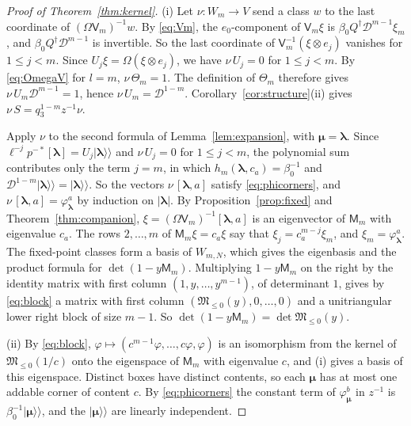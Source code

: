 \documentclass[11pt]{amsart}
\theoremstyle{definition}
\theoremstyle{remark}
\newcommand{\betaz}{\beta_0}                     %
\newcommand{\bl}{{\boldsymbol{\lambda}}}         %
\newcommand{\bmu}{{\boldsymbol{\mu}}}
\newcommand{\ceig}[1]{c_{#1}}                    %
\newcommand{\Wdeg}[2]{W_{#1,#2}}                 %
\newcommand{\Wsp}[1]{W_{#1}}                     %
\newcommand{\auxe}[1]{e_{#1}}                    %
\newcommand{\kket}[1]{\lvert #1\rangle\!\rangle} %
\newcommand{\fix}[1]{[#1]}                       %
\newcommand{\pt}[2]{[#1,#2]}                     %
\newcommand{\taut}{\ell}                         %
\newcommand{\pulm}{p^{-*}}                       %
\newcommand{\Shift}{S}                           %
\newcommand{\Omap}{\Omega}                       %
\newcommand{\DD}{\mathcal D}
\newcommand{\MM}{\mathsf M}
\newcommand{\Miura}[1]{\MM_{#1}}                 %
\newcommand{\VV}{\mathsf V}
\newcommand{\Vconj}[1]{\VV_{#1}}                 %
\newcommand{\Miuraop}{\mathfrak M}               %
\newcommand{\Miuraproj}{\Miuraop_{\leq0}}         %
\newcommand{\Meig}[2]{\varphi_{#1}^{#2}}         %
\newcommand{\Qan}{Q^\dagger}                     %
\begin{document}
\begin{proof}[Proof of Theorem~\ref{thm:kernel}]
(i) Let \(\nu\colon\Wsp{m}\to V\) send a class \(w\) to the last coordinate of
\((\Omap\Vconj{m})^{-1}w\).
By \eqref{eq:Vm}, the \(\auxe{0}\)-component of \(\Vconj{m}\xi\) is \(\betaz\Qan\DD^{m-1}\xi_m\), and
\(\betaz\Qan\DD^{m-1}\) is invertible. So the last coordinate of \(\Vconj{m}^{-1}(\xi\otimes\auxe{j})\) vanishes
for \(1\leq j<m\). Since \(U_j\xi=\Omap(\xi\otimes\auxe{j})\), we have \(\nu\,U_j=0\) for \(1\leq j<m\).
By \eqref{eq:OmegaV} for \(l=m\), \(\nu\,\Theta_m=1\). The definition of \(\Theta_m\) therefore gives
\(\nu\,U_m\DD^{m-1}=1\), hence \(\nu\,U_m=\DD^{1-m}\).
Corollary~\ref{cor:structure}(ii) gives \(\nu\,\Shift=q_3^{1-m}z^{-1}\nu\).

Apply \(\nu\) to the second formula of Lemma~\ref{lem:expansion}, with \(\bmu=\bl\).
Since \(\taut^{-j}\pulm\fix{\bl}=U_j\kket{\bl}\) and \(\nu\,U_j=0\) for \(1\leq j<m\),
the polynomial sum contributes only the term \(j=m\), in which
\(h_m(\bl,\ceig{a})=\betaz^{-1}\) and \(\DD^{1-m}\kket{\bl}=\kket{\bl}\). So the vectors \(\nu\,\pt{\bl}{a}\)
satisfy \eqref{eq:phicorners}, and \(\nu\,\pt{\bl}{a}=\Meig{\bl}{a}\) by induction on \(|\bl|\). By
Proposition~\ref{prop:fixed} and Theorem~\ref{thm:companion}, \(\xi=(\Omap\Vconj{m})^{-1}\pt{\bl}{a}\) is an
eigenvector of \(\Miura{m}\) with eigenvalue \(\ceig{a}\). The rows \(2,\dots,m\) of
\(\Miura{m}\xi=\ceig{a}\xi\) say that \(\xi_j=\ceig{a}^{m-j}\xi_m\), and \(\xi_m=\Meig{\bl}{a}\).
The fixed-point classes form a basis of \(\Wdeg{m}{N}\), which gives the eigenbasis
and the product formula for \(\det(1-y\Miura{m})\).
Multiplying \(1-y\Miura{m}\) on the right by the identity matrix with first column \((1,y,\dots,y^{m-1})\), of
determinant \(1\), gives by \eqref{eq:block} a matrix with first column \((\Miuraproj(y),0,\dots,0)\) and a
unitriangular lower right block of size \(m-1\). So \(\det(1-y\Miura{m})=\det\Miuraproj(y)\).

(ii) By \eqref{eq:block}, \(\varphi\mapsto(c^{m-1}\varphi,\dots,c\varphi,\varphi)\) is an isomorphism from the
kernel of \(\Miuraproj(1/c)\) onto the eigenspace of \(\Miura{m}\) with eigenvalue \(c\), and (i) gives a basis of
this eigenspace. Distinct boxes have distinct contents, so each \(\bmu\) has at most one addable corner of
content \(c\). By \eqref{eq:phicorners} the constant term of \(\Meig{\bmu}{b}\) in \(z^{-1}\) is
\(\betaz^{-1}\kket{\bmu}\), and the \(\kket{\bmu}\) are linearly independent.


\end{proof}
\end{document}
